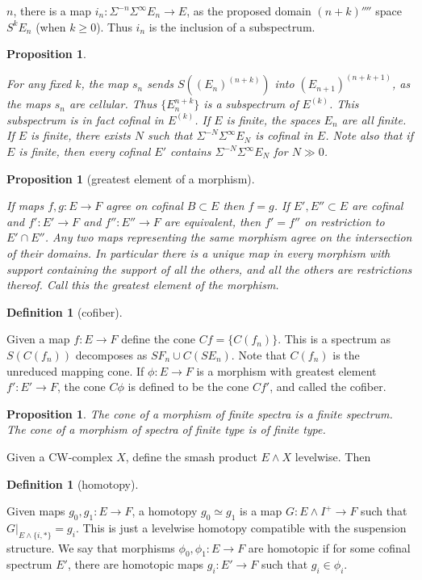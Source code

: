 \documentclass[11pt]{article}
\theoremstyle{plain}
\newtheorem{prop}[thm]{Proposition}
\theoremstyle{definition}
\newtheorem{defn}[thm]{Definition}
\begin{document}
$n$, there is a map $i_n:\Sigma^{-n}\Sigma^\infty E_n\to E$, as the proposed
domain $(n+k)\fourth$ space $S^kE_n$ (when $k\geq0$). Thus $i_n$ is the
inclusion of a subspectrum.
\setcounter{thm}{4}
\begin{prop}\hfil
\begin{itemise}
\itm[(i)] For any fixed $k$, the map $s_n$ sends $S((E_n)^{(n+k)})$ into
$(E_{n+1})^{(n+k+1)}$, as the maps $s_n$ are cellular. Thus $\{E_n^{n+k}\}$ is a
subspectrum of $E^{(k)}$. This subspectrum is in fact cofinal in $E^{(k)}$.
\itm[(ii)]If $E$ is finite, the spaces $E_n$ are all finite.
\itm[(iii)]If $E$ is finite, there exists $N$ such that 
$\Sigma^{-N}\Sigma^\infty E_N$ is cofinal in $E$.
\itm[NB:]Note also that if $E$ is finite, then every cofinal $E'$ contains
$\Sigma^{-N}\Sigma^\infty E_N$ for $N\gg0$.
\end{itemise}
\end{prop}
\begin{prop}[greatest element of a morphism]\hfil
\begin{itemise}
\itm[(i)] If maps $f,g:E\to F$ agree on cofinal $B\subset E$ then $f=g$.
\itm[(ii)] If $E',E''\subset E$ are cofinal and $f':E'\to F$ and $f'':E''\to F$
are equivalent, then $f'=f''$ on restriction to $E'\cap E''$.
\itm[(iii)] Any two maps representing the same morphism agree on the
intersection of their domains. In particular there is a unique map in every
morphism with support containing the support of all the others, and all the
others are restrictions thereof. Call this the greatest element of the morphism.
\end{itemise}
\end{prop}
\begin{defn}[cofiber]\hfil
\begin{itemise}
\itm[(a)] Given a map $f:E\to F$ define the cone $Cf=\{C(f_n)\}$. This is a
spectrum as $S(C(f_n))$ decomposes as $SF_n\cup C(SE_n)$. Note that $C(f_n)$ is
the unreduced mapping cone.
\itm[(b)] If $\phi:E\to F$ is a morphism with greatest element $f':E'\to F$,
the cone $C\phi$ is defined to be the cone $Cf'$, and called the cofiber.
\end{itemise}
\end{defn}
\begin{prop}
The cone of a morphism of finite spectra is a finite spectrum. The cone of a
morphism of spectra of finite type is of finite type.
\end{prop}
Given a CW-complex $X$, define the smash product $E\wedge X$ levelwise. Then
\begin{defn}[homotopy]\hfil
\begin{itemise}
\itm[(a)] Given maps $g_0,g_1:E\to F$, a homotopy $g_0\simeq g_1$ is a map
$G:E\wedge I^+\to F$ such that $G|_{E\wedge\{i,*\}}=g_i$. This is just a 
levelwise homotopy compatible with the suspension structure.
\itm[(b)] We say that morphisms $\phi_0,\phi_1:E\to F$ are homotopic if for some
cofinal spectrum $E'$, there are homotopic maps $g_i:E'\to F$ such that
$g_i\in\phi_i$.
\end{itemise}
\end{defn}
\end{document}
